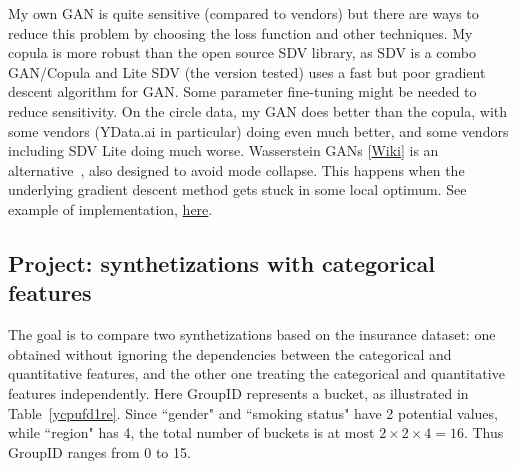 \documentclass[oneside,10pt]{book}
\begin{document}
My own GAN is quite sensitive (compared to vendors) but there are ways to reduce this problem by choosing the loss function and other techniques. My copula is more robust than the open source SDV library, as SDV is a combo GAN/Copula and Lite SDV (the version tested) uses a fast but poor gradient descent algorithm for GAN. Some parameter fine-tuning might be needed to reduce sensitivity. On the circle data,  my GAN does better than the copula, with some vendors (YData.ai in particular) doing even much better, and some vendors including SDV Lite doing much worse. 
\textcolor{index}{Wasserstein GANs} [\href{https://en.wikipedia.org/wiki/Wasserstein_GAN}{Wiki}] is an alternative~\cite{ieeewgan}, also designed to avoid 
\textcolor{index}{mode collapse}. This happens when the underlying \textcolor{index}{gradient descent} method gets stuck in some local optimum. 
See example of implementation, \href{https://machinelearningmastery.com/how-to-code-a-wasserstein-generative-adversarial-network-wgan-from-scratch/}{here}.

\subsection{Project: synthetizations with categorical features}

The goal is to compare two synthetizations based on the insurance dataset: one obtained without ignoring the dependencies between the categorical and quantitative features, and the other one treating the 
 categorical and quantitative features independently. Here GroupID represents a \textcolor{index}{bucket}, as illustrated in
 Table~\ref{ycpufd1re}. Since ``gender" and ``smoking status" have 2 potential values, while ``region" has 4, the total number
 of buckets is at most $2\times 2\times 4 = 16$. Thus GroupID ranges from 0 to 15.
\end{document}
